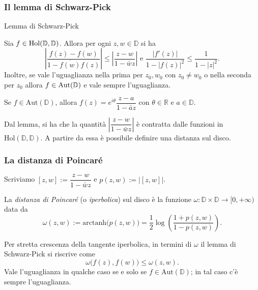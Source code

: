 \begin{frame}
  \frametitle{Il lemma di Schwarz-Pick}
  \begin{block}{Lemma di Schwarz-Pick} \label{SP}
    \begin{itshape}
      Sia $f \in \text{\normalfont{Hol}}(\mathbb{D},\mathbb{D})$. Allora per ogni $z, w \in \mathbb{D}$ si ha
      $$\left|\frac{f(z)-f(w)}{1-\overline{f(w)}f(z)}\right| \le \left|\frac{z-w}{1-\bar{w}z}\right| \text{ e } \frac{|f'(z)|}{1-|f(z)|^2} \le \frac{1}{1-|z|^2}.$$
      Inoltre, se vale l'uguaglianza nella prima per $z_0, w_0$ con $z_0 \not=w_0$ o nella seconda per $z_0$ allora $f \in \text{\normalfont{Aut}}(\mathbb{D})$ e vale sempre l'uguaglianza.
    \end{itshape}
  \end{block}
  \pause
  \begin{oss}
    Se $f \in \text{Aut}(\mathbb{D})$, allora $f(z)=e^{i\theta}\dfrac{z-a}{1-\bar{a}z}$ con $\theta \in \mathbb{R}$ e $a \in \mathbb{D}$.
  \end{oss}
  \pause
  Dal lemma, si ha che la quantità $\left|\dfrac{z-w}{1-\bar{w}z}\right|$ è contratta dalle funzioni in $\text{Hol}(\mathbb{D},\mathbb{D})$. A partire da essa è possibile definire una distanza sul disco.
\end{frame}

\begin{frame}
  \frametitle{La distanza di Poincaré}
  Scriviamo $[z,w]:=\dfrac{z-w}{1-\bar{w}z}$ e $p(z,w):=|[z,w]|$. \pause
  \begin{defn}
    La \textit{distanza di Poincaré} (o \textit{iperbolica}) sul disco è la funzione $\omega:\mathbb{D}\times \mathbb{D} \longrightarrow [0,+\infty)$ data da
    $$\omega(z,w):=\text{arctanh}\bigl(p(z,w)\bigr)=\frac{1}{2}\log\left(\frac{1+p(z,w)}{1-p(z,w)}\right).$$
  \end{defn}
  \pause
  Per stretta crescenza della tangente iperbolica, in termini di $\omega$ il lemma di Schwarz-Pick si riscrive come
  $$\omega\bigl(f(z),f(w)\bigr) \le \omega(z,w).$$
  Vale l'uguaglianza in qualche caso se e solo se $f \in \text{Aut}(\mathbb{D})$; in tal caso c'è sempre l'uguaglianza.
\end{frame}
